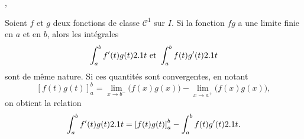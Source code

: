 \begin{theo}\label{theo:derivationsoussigneintegrale}
\end{theo}

\begin{theo}\label{theo:seriesalternees}
\end{theo}

\begin{theo}\label{theo:prolongementDesDerivees}
\end{theo}

\begin{theo}\label{theo:taylorresteintegral}
\end{theo}

\begin{theo}\label{theo:formuleprobabilitestotales}
\end{theo}

\begin{theo}\label{theo:fondamentalanalyse}
\end{theo}

\begin{theo}\label{theo:tayloryoung}
\end{theo}

\begin{theo}\label{theo:caracterisationsequentiellelimite},
\end{theo}

\begin{theo}\label{theo:ippgeneralisees}
    Soient $f$ et $g$ deux fonctions de classe $\mathscr{C}^1$ sur $I$. Si la fonction $fg$ a une limite finie en $a$ et en $b$, alors les intégrales
    \[
    \int_a^b f'(t)g(t) 2.1 t \text{ et } \int_a^b f(t) g'(t) 2.1 t
    \]
    sont de même nature. Si ces quantités sont convergentes, en notant
    \[
        [f(t)g(t)]_a^b = \lim_{x \to b^-} \big(f(x)g(x)\big) - \lim_{x \to a^+} \big(f(x)g(x)\big),
    \]
    on obtient la relation
    \[
    \int_a^b f'(t) g(t) 2.1 t = \left[f(t)g(t)\right]_a^b - \int_a^b f(t) g'(t) 2.1 t.
    \]
\end{theo}